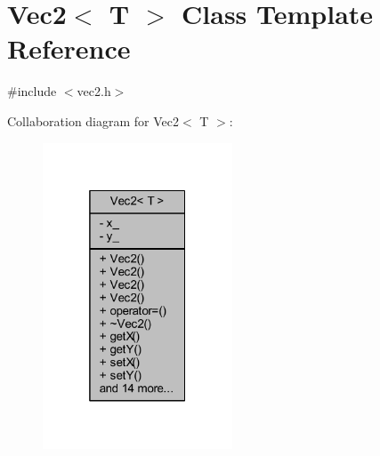 \hypertarget{class_vec2}{}\section{Vec2$<$ T $>$ Class Template Reference}
\label{class_vec2}


{\ttfamily \#include $<$vec2.\+h$>$}



Collaboration diagram for Vec2$<$ T $>$\+:
\nopagebreak
\begin{figure}[H]
\begin{center}
\leavevmode
\includegraphics[width=160pt]{class_vec2__coll__graph}
\end{center}
\end{figure}
